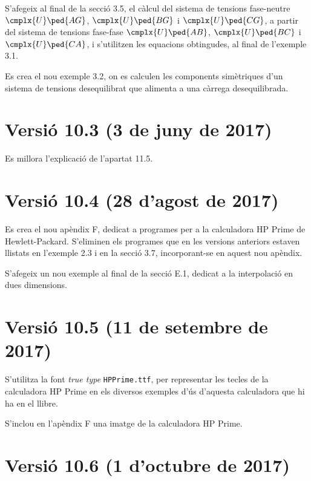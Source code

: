 S'afegeix al final de la secció 3.5, el càlcul del sistema de tensions fase-neutre $\cmplx{U}\ped{AG}$, $\cmplx{U}\ped{BG}$ i $\cmplx{U}\ped{CG}$, a partir del sistema de tensions fase-fase $\cmplx{U}\ped{AB}$, $\cmplx{U}\ped{BC}$ i $\cmplx{U}\ped{CA}$, i s'utilitzen les equacions obtingudes, al final de l'exemple 3.1.

Es crea el nou exemple 3.2, on es calculen les components simètriques d'un sistema de tensions desequilibrat que alimenta a una càrrega desequilibrada.

\section*{Versió 10.3 (3 de juny de 2017)}

Es millora l'explicació de l'apartat 11.5.

\section*{Versió 10.4 (28 d'agost de 2017)}

Es crea el nou apèndix F, dedicat a programes per a la calculadora \textsf{HP Prime} de Hewlett-Packard. S'eliminen els programes que en les versions anteriors estaven llistats en l'exemple 2.3 i en la secció 3.7, incorporant-se en aquest nou apèndix.

S'afegeix un nou exemple al final de la secció E.1, dedicat  a la interpolació en dues dimensions.

\section*{Versió 10.5 (11 de setembre de 2017)}

S'utilitza la font \textit{true type} \texttt{HPPrime.ttf}, per representar les tecles de la calculadora \textsf{HP Prime} en els diversos exemples d'ús d'aquesta calculadora que hi ha en el llibre.

S'inclou en l'apèndix F una imatge de la calculadora \textsf{HP Prime}.


\section*{Versió 10.6 (1 d'octubre de 2017)}

